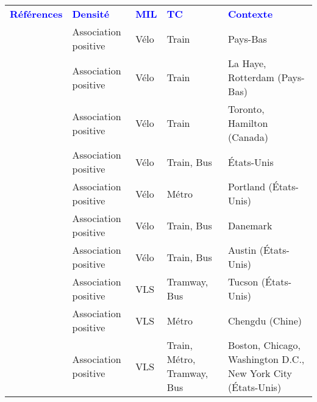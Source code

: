         \begin{longtable}{p{3cm}p{3cm}p{1.5cm}p{1.8cm}p{3.3cm}}
        \hline
        \textcolor{blue}{\textbf{Références}} & \textcolor{blue}{\textbf{Densité}} & \textcolor{blue}{\textbf{MIL}} & \textcolor{blue}{\textbf{TC}} & \textcolor{blue}{\textbf{Contexte}}
        \hline
        \endhead
\multicolumn{5}{l}{\textbf{Effets positifs}}\\
    \small{\textcite{shelat_analysing_2018}}\index{Shelat, Sanmay|pagebf} & \small{Association positive} & \small{Vélo} & \small{Train} & \small{Pays-Bas}\\ 
    \small{\textcite{la_paix_puello_integration_2016}}\index{La Paix Puello, Lissy|pagebf} & \small{Association positive} & \small{Vélo} & \small{Train} & \small{La Haye, Rotterdam (Pays-Bas)}\\
    \small{\textcite{chan_factors_2020}}\index{Chan, Kevin|pagebf} & \small{Association positive} & \small{Vélo} & \small{Train} & \small{Toronto, Hamilton (Canada)}\\ 
    \small{\textcite{wang_bicycle-transit_2013}}\index{Wang, Rui|pagebf} & \small{Association positive} & \small{Vélo} & \small{Train, Bus} & \small{États-Unis}\\ 
    \small{\textcite{singleton_exploring_2014}}\index{Singleton, Patrick A.|pagebf} & \small{Association positive} & \small{Vélo} & \small{Métro} & \small{Portland (États-Unis)}\\
    \small{\textcite{nielsen_bikeability_2018}}\index{Nielsen, Thomas Alexander Sick|pagebf} & \small{Association positive} & \small{Vélo} & \small{Train, Bus} & \small{Danemark}\\
    \small{\textcite{li_exploring_2017}}\index{Li, Wenxiang|pagebf} & \small{Association positive} & \small{Vélo} & \small{Train, Bus} & \small{Austin (États-Unis)}\\
    \small{\textcite{li_investigating_2022}}\index{Li, Xiaofeng|pagebf} & \small{Association positive} & \small{VLS} & \small{Tramway, Bus} & \small{Tucson (États-Unis)}\\
    \small{\textcite{bocker_bike_2020}}\index{Böcker, Lars|pagebf} & \small{Association positive} & \small{VLS} & \small{Métro} & \small{Chengdu (Chine)}\\
    \small{\textcite{kong_deciphering_2020}}\index{Kong, Hui|pagebf} & \small{Association positive} & \small{VLS} & \small{Train, Métro, Tramway, Bus} & \small{Boston, Chicago, Washington D.C., New York City (États-Unis)}\\

\end{longtable}
